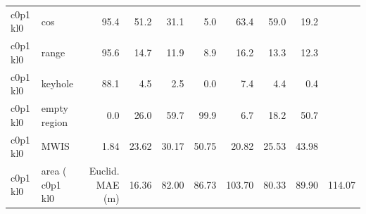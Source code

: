 \begin{table}[t]
{\begin{tabular}{llrrrrrrr}
c0p1 kl0 & cos & 95.4 & 51.2 & 31.1 & 5.0 & 63.4 & 59.0 & 19.2 \\
c0p1 kl0 & range & 95.6 & 14.7 & 11.9 & 8.9 & 16.2 & 13.3 & 12.3 \\
c0p1 kl0 & keyhole & 88.1 & 4.5 & 2.5 & 0.0 & 7.4 & 4.4 & 0.4 \\
c0p1 kl0 & empty region & 0.0 & 26.0 & 59.7 & 99.9 & 6.7 & 18.2 & 50.7 \\
c0p1 kl0 & MWIS & 1.84 & 23.62 & 30.17 & 50.75 & 20.82 & 25.53 & 43.98 \\
c0p1 kl0 & area (%
c0p1 kl0 & Euclid. MAE (m) & 16.36 & 82.00 & 86.73 & 103.70 & 80.33 & 89.90 & 114.07 \\
\bottomrule
\end{tabular}}
\end{table}